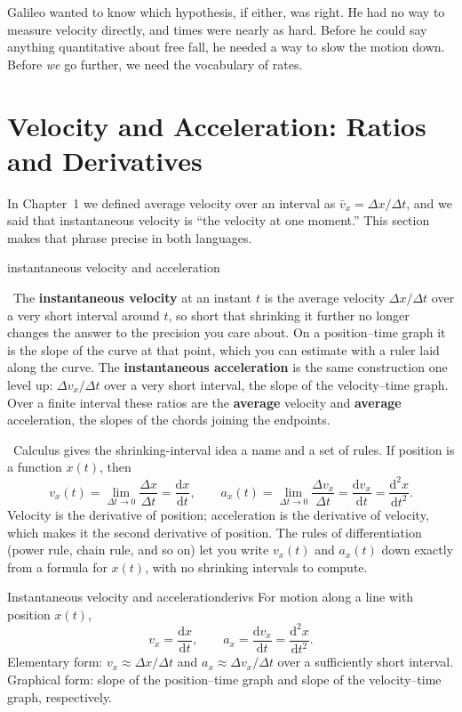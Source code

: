 \documentclass[11pt,twoside,openany]{book}
\newcommand{\dd}{\mathrm{d}}
\newcommand{\deriv}[2]{\frac{\dd #1}{\dd #2}}
\newcommand{\dderiv}[2]{\frac{\dd^2 #1}{\dd #2^2}}
\newcommand{\viewtag}[3]{\fcolorbox{#2}{#3}{\footnotesize\textbf{\textcolor{#2}{#1}}}}
\newcommand{\elemtag}{\viewtag{Elementary}{elemcol}{elempale}}
\newcommand{\calctag}{\viewtag{Calculus}{calccol}{calcpale}}
\newcommand{\elem}{\par\medskip\noindent\elemtag\ }
\newcommand{\calc}{\par\medskip\noindent\calctag\ }
\begin{document}
Galileo wanted to know which hypothesis, if either, was right. He had no way to measure velocity directly, and times were nearly as hard. Before he could say anything quantitative about free fall, he needed a way to slow the motion down. Before \emph{we} go further, we need the vocabulary of rates.

\section{Velocity and Acceleration: Ratios and Derivatives}
\label{sec:calculus}

In Chapter~1 we defined average velocity over an interval as $\bar v_x = \Delta x/\Delta t$, and we said that instantaneous velocity is ``the velocity at one moment.'' This section makes that phrase precise in both languages.

\begin{twoviews}{instantaneous velocity and acceleration}
\elem The \textbf{instantaneous velocity} at an instant $t$ is the average velocity $\Delta x/\Delta t$ over a very short interval around $t$, so short that shrinking it further no longer changes the answer to the precision you care about. On a position--time graph it is the slope of the curve at that point, which you can estimate with a ruler laid along the curve. The \textbf{instantaneous acceleration} is the same construction one level up: $\Delta v_x/\Delta t$ over a very short interval, the slope of the velocity--time graph. Over a finite interval these ratios are the \textbf{average} velocity and \textbf{average} acceleration, the slopes of the chords joining the endpoints.

\calc Calculus gives the shrinking-interval idea a name and a set of rules. If position is a function $x(t)$, then
\[
v_x(t) = \lim_{\Delta t \to 0}\frac{\Delta x}{\Delta t} = \deriv{x}{t},
\qquad
a_x(t) = \lim_{\Delta t \to 0}\frac{\Delta v_x}{\Delta t} = \deriv{v_x}{t} = \dderiv{x}{t}.
\]
Velocity is the derivative of position; acceleration is the derivative of velocity, which makes it the second derivative of position. The rules of differentiation (power rule, chain rule, and so on) let you write $v_x(t)$ and $a_x(t)$ down exactly from a formula for $x(t)$, with no shrinking intervals to compute.
\end{twoviews}

\begin{definition}{Instantaneous velocity and acceleration}{derivs}
For motion along a line with position $x(t)$,
\[
v_x = \deriv{x}{t}, \qquad a_x = \deriv{v_x}{t} = \dderiv{x}{t}.
\]
Elementary form: $v_x \approx \Delta x/\Delta t$ and $a_x \approx \Delta v_x/\Delta t$ over a sufficiently short interval. Graphical form: slope of the position--time graph and slope of the velocity--time graph, respectively.
\end{definition}
\end{document}
